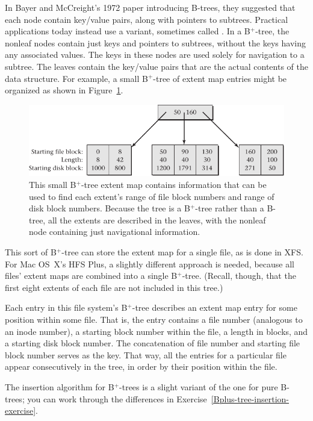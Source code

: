 In Bayer and McCreight's 1972 paper introducing B-trees, they
suggested that each node contain key/value pairs, along with pointers
to subtrees.  Practical applications today instead use a variant,
sometimes called .  In a
B${}^+$-tree, the nonleaf nodes contain just keys and pointers to
subtrees, without the keys having any associated values.  The keys in
these nodes are used solely for navigation to a subtree.  The leaves
contain the key/value pairs that are the actual contents of the data
structure.  For example, a small B${}^+$-tree of extent map entries
might be organized as shown in Figure~\ref{B-plus-tree}.
\begin{figure}
\centerline{\includegraphics{hail_f0813}}
\caption{This small B${}^+$-tree extent map contains information that
can be used to find
each extent's range of file block numbers and range of disk block
numbers.  Because the tree is a B${}^+$-tree rather than a B-tree, all
the extents are described in the leaves, with the nonleaf node containing
just navigational information.}
\label{B-plus-tree}
\end{figure}

This sort of B${}^+$-tree can store the extent map for a single file,
as is done in XFS.  For Mac OS~X's HFS Plus, a slightly different
approach is needed, because all files' extent maps are combined into a
single B${}^+$-tree.  (Recall, though, that the first eight extents of
each file are not included in this tree.)

Each entry in this file system's B${}^+$-tree describes an extent map
entry for some position within some file.  That is, the entry contains
a file number (analogous to an inode number), a starting block number
within the file, a length in blocks, and a starting disk block
number.  The concatenation of file number and starting file block
number serves as the key.  That way, all the entries for a particular
file appear consecutively in the tree, in order by their position
within the file.

The insertion algorithm for B${}^+$-trees is a slight variant of the
one for pure B-trees; you can work through the differences in
Exercise~\ref{Bplus-tree-insertion-exercise}.

